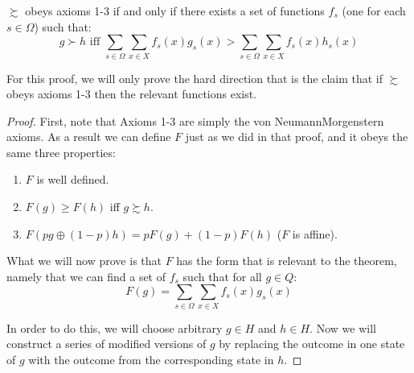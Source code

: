 \begin{proposition}
\label{p:aa-state-dependent}
    $\succsim$ obeys axioms 1-3 if and only if there exists a set of functions $f_s$ (one for each $s \in \Omega$) such that:
    \begin{equation*}
    g \succ h \text{ iff } \sum_{s \in \Omega} \sum_{x \in X} f_s(x) g_s(x) > \sum_{s \in \Omega} \sum_{x \in X} f_s(x) h_s(x)
    \end{equation*}
\end{proposition}

For this proof, we will only prove the hard direction that is the claim that if $\succsim$ obeys axioms 1-3 then the relevant functions exist. 

\begin{proof}
First, note that Axioms 1-3 are simply the von Neumann\breakslash Morgenstern axioms. As a result we can define $F$ just as we did in that proof, and it obeys the same three properties:
\begin{enumerate}
    \item $F$ is well defined.
    \item $F(g) \geq F(h)$ iff $g \succsim h$.  
    \item $F(pg \oplus (1-p)h) = pF(g) + (1-p)F(h)$ ($F$ is affine).
\end{enumerate} 

What we will now prove is that $F$ has the form that is relevant to the theorem, namely that we can find a set of $f_s$ such that for all $g \in Q$:
\begin{equation*}
    F(g) = \sum_{s \in \Omega} \sum_{x \in X} f_s(x) g_s(x)
\end{equation*}

In order to do this, we will choose arbitrary $g \in H$ and $h \in H$.  Now we will construct a series of modified versions of $g$ by replacing the outcome in one state of $g$ with the outcome from the corresponding state in $h$. 


\end{proof}
